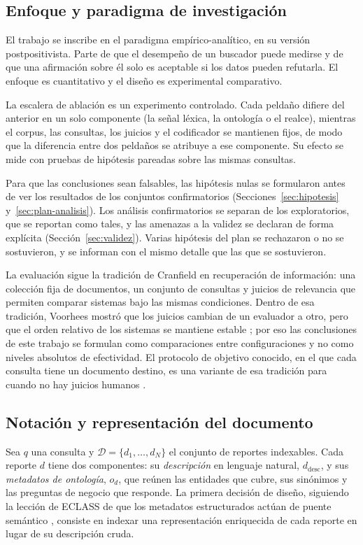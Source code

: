 \documentclass[11pt,letterpaper]{article}
\numberwithin{equation}{section}
\begin{document}
\subsection{Enfoque y paradigma de investigación}
\label{sec:paradigma}
El trabajo se inscribe en el paradigma empírico-analítico, en su versión postpositivista. Parte de que el desempeño de un buscador puede medirse y de que una afirmación sobre él solo es aceptable si los datos pueden refutarla. El enfoque es cuantitativo y el diseño es experimental comparativo.

La escalera de ablación es un experimento controlado. Cada peldaño difiere del anterior en un solo componente (la señal léxica, la ontología o el realce), mientras el corpus, las consultas, los juicios y el codificador se mantienen fijos, de modo que la diferencia entre dos peldaños se atribuye a ese componente. Su efecto se mide con pruebas de hipótesis pareadas sobre las mismas consultas.

Para que las conclusiones sean falsables, las hipótesis nulas se formularon antes de ver los resultados de los conjuntos confirmatorios (Secciones~\ref{sec:hipotesis} y~\ref{sec:plan-analisis}). Los análisis confirmatorios se separan de los exploratorios, que se reportan como tales, y las amenazas a la validez se declaran de forma explícita (Sección~\ref{sec:validez}). Varias hipótesis del plan se rechazaron o no se sostuvieron, y se informan con el mismo detalle que las que se sostuvieron.

La evaluación sigue la tradición de Cranfield en recuperación de información: una colección fija de documentos, un conjunto de consultas y juicios de relevancia que permiten comparar sistemas bajo las mismas condiciones. Dentro de esa tradición, Voorhees mostró que los juicios cambian de un evaluador a otro, pero que el orden relativo de los sistemas se mantiene estable \cite{voorhees2000variations}; por eso las conclusiones de este trabajo se formulan como comparaciones entre configuraciones y no como niveles absolutos de efectividad. El protocolo de objetivo conocido, en el que cada consulta tiene un documento destino, es una variante de esa tradición para cuando no hay juicios humanos \cite{azzopardi2007simulated}.

\subsection{Notación y representación del documento}
Sea $q$ una consulta y $\mathcal{D}=\{d_1,\dots,d_N\}$ el conjunto de reportes indexables. Cada reporte $d$ tiene dos componentes: su \emph{descripción} en lenguaje natural, $d_{\text{desc}}$, y sus \emph{metadatos de ontología}, $o_d$, que reúnen las entidades que cubre, sus sinónimos y las preguntas de negocio que responde. La primera decisión de diseño, siguiendo la lección de ECLASS de que los metadatos estructurados actúan de puente semántico \cite{baumgart2026eclass}, consiste en indexar una representación enriquecida de cada reporte en lugar de su descripción cruda.
\end{document}
